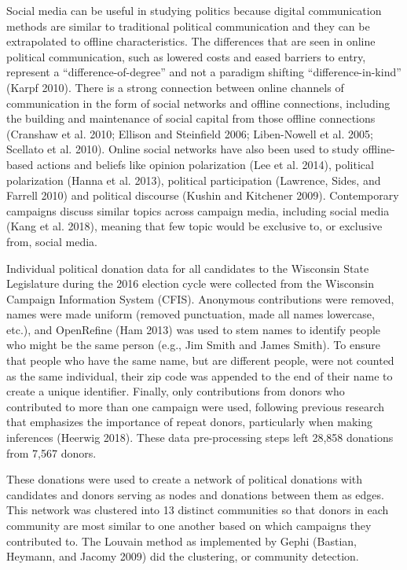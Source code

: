 \documentclass[12pt,]{article}
\begin{document}
Social media can be useful in studying politics because digital
communication methods are similar to traditional political communication
and they can be extrapolated to offline characteristics. The differences
that are seen in online political communication, such as lowered costs
and eased barriers to entry, represent a ``difference-of-degree'' and
not a paradigm shifting ``difference-in-kind'' (Karpf 2010). There is a
strong connection between online channels of communication in the form
of social networks and offline connections, including the building and
maintenance of social capital from those offline connections (Cranshaw
et al. 2010; Ellison and Steinfield 2006; Liben-Nowell et al. 2005;
Scellato et al. 2010). Online social networks have also been used to
study offline-based actions and beliefs like opinion polarization (Lee
et al. 2014), political polarization (Hanna et al. 2013), political
participation (Lawrence, Sides, and Farrell 2010) and political
discourse (Kushin and Kitchener 2009). Contemporary campaigns discuss
similar topics across campaign media, including social media (Kang et
al. 2018), meaning that few topic would be exclusive to, or exclusive
from, social media.

Individual political donation data for all candidates to the Wisconsin
State Legislature during the 2016 election cycle were collected from the
Wisconsin Campaign Information System (CFIS). Anonymous contributions
were removed, names were made uniform (removed punctuation, made all
names lowercase, etc.), and OpenRefine (Ham 2013) was used to stem names
to identify people who might be the same person (e.g., Jim Smith and
James Smith). To ensure that people who have the same name, but are
different people, were not counted as the same individual, their zip
code was appended to the end of their name to create a unique
identifier. Finally, only contributions from donors who contributed to
more than one campaign were used, following previous research that
emphasizes the importance of repeat donors, particularly when making
inferences (Heerwig 2018). These data pre-processing steps left 28,858
donations from 7,567 donors.

These donations were used to create a network of political donations
with candidates and donors serving as nodes and donations between them
as edges. This network was clustered into 13 distinct communities so
that donors in each community are most similar to one another based on
which campaigns they contributed to. The Louvain method as implemented
by Gephi (Bastian, Heymann, and Jacomy 2009) did the clustering, or
community detection.
\end{document}
